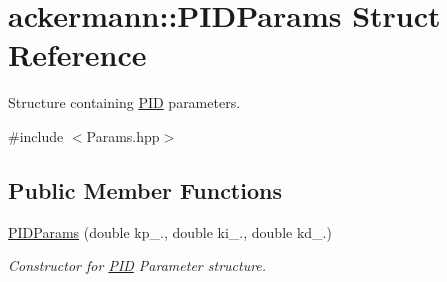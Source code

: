 \hypertarget{structackermann_1_1_p_i_d_params}{}\section{ackermann\+:\+:P\+I\+D\+Params Struct Reference}
\label{structackermann_1_1_p_i_d_params}


Structure containing \hyperlink{classackermann_1_1_p_i_d}{P\+ID} parameters.  




{\ttfamily \#include $<$Params.\+hpp$>$}

\subsection*{Public Member Functions}
\begin{DoxyCompactItemize}
\item 
\hyperlink{structackermann_1_1_p_i_d_params_abc40fbe7129262423b702336914df26a}{P\+I\+D\+Params} (double kp\+\_., double ki\+\_., double kd\+\_.)
\begin{DoxyCompactList}\small\item\em Constructor for \hyperlink{classackermann_1_1_p_i_d}{P\+ID} Parameter structure. \end{DoxyCompactList}\end{DoxyCompactItemize}
